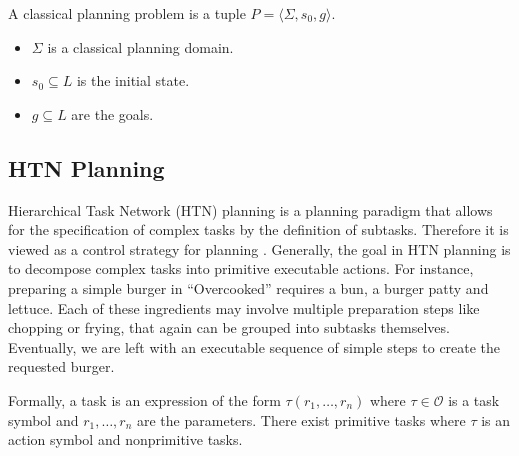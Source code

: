\begin{definition}
  A classical planning problem is a tuple $P=\langle \Sigma, s_0, g \rangle$.
  \begin{itemize}
    \item $\Sigma$ is a classical planning domain.
    \item $s_0 \subseteq L$ is the initial state.
    \item $g \subseteq L$ are the goals.
  \end{itemize}
\end{definition}

\subsection{HTN Planning}\label{sec:htn-planning}

Hierarchical Task Network (HTN) planning is a planning paradigm that allows for the specification of complex tasks by the definition of subtasks.
Therefore it is viewed as a control strategy for planning \citep[chap.~11]{ghallabAutomatedPlanningTheory2004}.
Generally, the goal in HTN planning is to decompose complex tasks into primitive executable actions.
For instance, preparing a simple burger in ``Overcooked'' requires a bun, a burger patty and lettuce.
Each of these ingredients may involve multiple preparation steps like chopping or frying, that again can be grouped into subtasks themselves.
Eventually, we are left with an executable sequence of simple steps to create the requested burger.



Formally, a task is an expression of the form $\tau(r_1,\dots,r_n)$ where $\tau \in \mathcal{O}$ is a task symbol and $r_1,\dots,r_n$ are the parameters.
There exist primitive tasks where $\tau$ is an action symbol and nonprimitive tasks.

